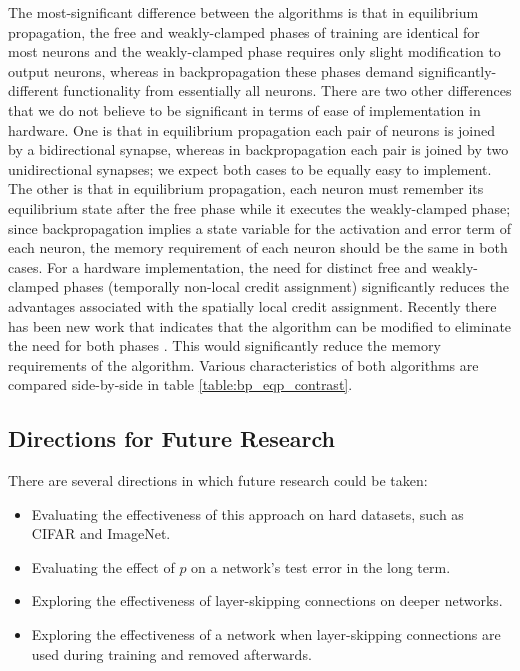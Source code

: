 \documentclass[utf8]{frontiersSCNS}
\begin{document}
The most-significant difference between the algorithms is that in equilibrium propagation, the free
and weakly-clamped phases of training are identical for most neurons and the weakly-clamped phase 
requires only slight modification to output neurons, whereas in backpropagation these phases demand significantly-different functionality from essentially all neurons. There are two other differences that we do not believe to be significant in terms of ease of implementation in hardware. One is that in equilibrium propagation each pair of neurons is joined by a bidirectional synapse, whereas in backpropagation each pair is joined by two unidirectional synapses; we expect both cases to be equally easy to implement. The other is that in equilibrium propagation, each neuron must remember its equilibrium state after the free phase while it executes the weakly-clamped phase; since backpropagation implies a state variable for the activation and error term of each neuron, the memory requirement of each neuron should be the same in both cases.
For a hardware implementation, the need for distinct free and weakly-clamped phases (temporally non-local credit assignment) significantly reduces the advantages associated with the spatially local credit assignment. Recently there has been new work that indicates that the algorithm can be modified to eliminate the need for both phases \citep{ernoult2020}. This would significantly reduce the memory requirements of the algorithm. Various characteristics of both algorithms are compared side-by-side in table \ref{table:bp_eqp_contrast}. 

\subsection{Directions for Future Research}

There are several directions in which future research could be taken:
\begin{itemize} 
\item Evaluating the effectiveness of this approach on hard datasets, such as CIFAR and ImageNet.
\item Evaluating the effect of $p$ on a network's test error in the long term.
\item Exploring the effectiveness of layer-skipping connections on deeper networks.
\item Exploring the effectiveness of a network when layer-skipping connections are used during training and removed afterwards.
\end{itemize}
\end{document}
